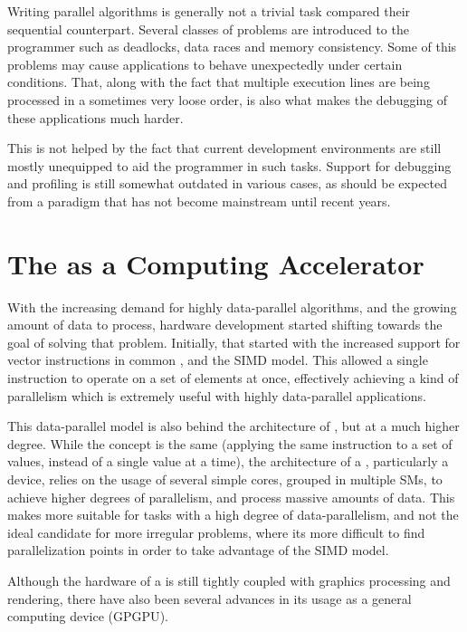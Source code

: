\documentclass[main.tex]{subfiles}
\begin{document}
Writing parallel algorithms is generally not a trivial task compared their sequential counterpart. Several classes of problems are introduced to the programmer such as deadlocks, data races and memory consistency. Some of this problems may cause applications to behave unexpectedly under certain conditions. That, along with the fact that multiple execution lines are being processed in a sometimes very loose order, is also what makes the debugging of these applications much harder.

This is not helped by the fact that current development environments are still mostly unequipped to aid the programmer in such tasks. Support for debugging and profiling is still somewhat outdated in various cases, as should be expected from a paradigm that has not become mainstream until recent years.


\section{The \gpu as a Computing Accelerator}

With the increasing demand for highly data-parallel algorithms, and the growing amount of data to process, hardware development started shifting towards the goal of solving that problem. Initially, that started with the increased support for vector instructions in common \cpus, and the \acs{SIMD} model. This allowed a single instruction to operate on a set of elements at once, effectively achieving a kind of parallelism which is extremely useful with highly data-parallel applications.

This data-parallel model is also behind the architecture of \gpus, but at a much higher degree. While the concept is the same (applying the same instruction to a set of values, instead of a single value at a time), the architecture of a \gpu, particularly a \cuda device, relies on the usage of several simple cores, grouped in multiple \aclp{SM}, to achieve higher degrees of parallelism, and process massive amounts of data. This makes \gpus more suitable for tasks with a high degree of data-parallelism, and not the ideal candidate for more irregular problems, where its more difficult to find parallelization points in order to take advantage of the \acs{SIMD} model.

Although the hardware of a \gpu is still tightly coupled with graphics processing and rendering, there have also been several advances in its usage as a general computing device (\acs{GPGPU}).

\end{document}
